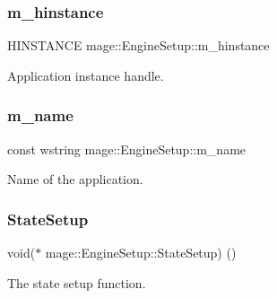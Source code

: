\subsubsection{\texorpdfstring{m\+\_\+hinstance}{m\_hinstance}}
{\footnotesize\ttfamily H\+I\+N\+S\+T\+A\+N\+CE mage\+::\+Engine\+Setup\+::m\+\_\+hinstance\hspace{0.3cm}{\ttfamily [private]}}

Application instance handle. \hypertarget{structmage_1_1_engine_setup_a40fba981d4b1c30eff304b029a013009}{}\label{structmage_1_1_engine_setup_a40fba981d4b1c30eff304b029a013009} 
\subsubsection{\texorpdfstring{m\+\_\+name}{m\_name}}
{\footnotesize\ttfamily const wstring mage\+::\+Engine\+Setup\+::m\+\_\+name\hspace{0.3cm}{\ttfamily [private]}}

Name of the application. \hypertarget{structmage_1_1_engine_setup_a36a3c8a316c63e6c90ee9dd6efb82c0c}{}\label{structmage_1_1_engine_setup_a36a3c8a316c63e6c90ee9dd6efb82c0c} 
\subsubsection{\texorpdfstring{State\+Setup}{StateSetup}}
{\footnotesize\ttfamily void($\ast$ mage\+::\+Engine\+Setup\+::\+State\+Setup) ()\hspace{0.3cm}{\ttfamily [private]}}

The state setup function. 